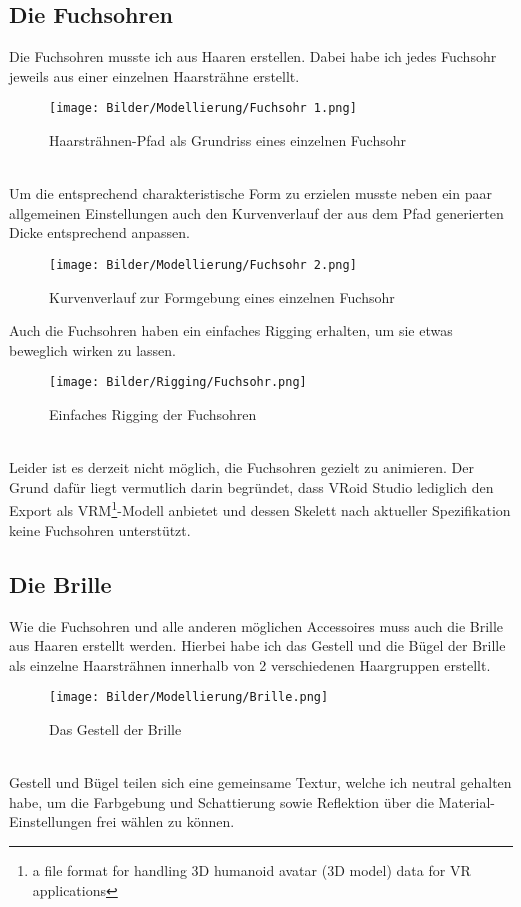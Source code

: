 \documentclass[a4paper, 12pt]{article}
\begin{document}
\subsection{Die Fuchsohren}
\label{subsec:foxears}
Die Fuchsohren musste ich aus Haaren erstellen.
Dabei habe ich jedes Fuchsohr jeweils aus einer einzelnen Haarsträhne erstellt.
\begin{figure}[htbp]
    \centering
    \texttt{[image: Bilder/Modellierung/Fuchsohr 1.png]}
    \caption{Haarsträhnen-Pfad als Grundriss eines einzelnen Fuchsohr}
\end{figure}
\\Um die entsprechend charakteristische Form zu erzielen
musste neben ein paar allgemeinen Einstellungen
auch den Kurvenverlauf der aus dem Pfad generierten Dicke entsprechend anpassen\cite{tut-foxears}.
\begin{figure}[htbp]
    \centering
    \texttt{[image: Bilder/Modellierung/Fuchsohr 2.png]}
    \caption{Kurvenverlauf zur Formgebung eines einzelnen Fuchsohr}
\end{figure}
\newpage
Auch die Fuchsohren haben ein einfaches Rigging erhalten, um sie etwas beweglich wirken zu lassen.
\begin{figure}[htbp]
    \centering
    \texttt{[image: Bilder/Rigging/Fuchsohr.png]}
    \caption{Einfaches Rigging der Fuchsohren}
\end{figure}
\\Leider ist es derzeit nicht möglich,
die Fuchsohren gezielt zu animieren.
Der Grund dafür liegt vermutlich darin begründet,
dass VRoid Studio lediglich
den Export als VRM\footnote{a file format for handling 3D humanoid avatar (3D model) data for VR applications\cite{vrm-page}}-Modell anbietet
und dessen Skelett nach aktueller Spezifikation\cite{vrm-spec-head} keine Fuchsohren unterstützt.
\newpage

\subsection{Die Brille}
\label{subsec:glasses}
Wie die Fuchsohren und alle anderen möglichen Accessoires muss auch die Brille aus Haaren erstellt werden\cite{tut-glasses1}\cite{tut-glasses2}.
Hierbei habe ich das Gestell und die Bügel der Brille als einzelne Haarsträhnen innerhalb von 2 verschiedenen Haargruppen erstellt.
\begin{figure}[htbp]
    \centering
    \texttt{[image: Bilder/Modellierung/Brille.png]}
    \caption{Das Gestell der Brille}
\end{figure}
\\Gestell und Bügel teilen sich eine gemeinsame Textur\cite{tut-glasses2},
welche ich neutral gehalten habe,
um die Farbgebung und Schattierung sowie Reflektion
über die Material-Einstellungen frei wählen zu können.
\newpage
\end{document}
